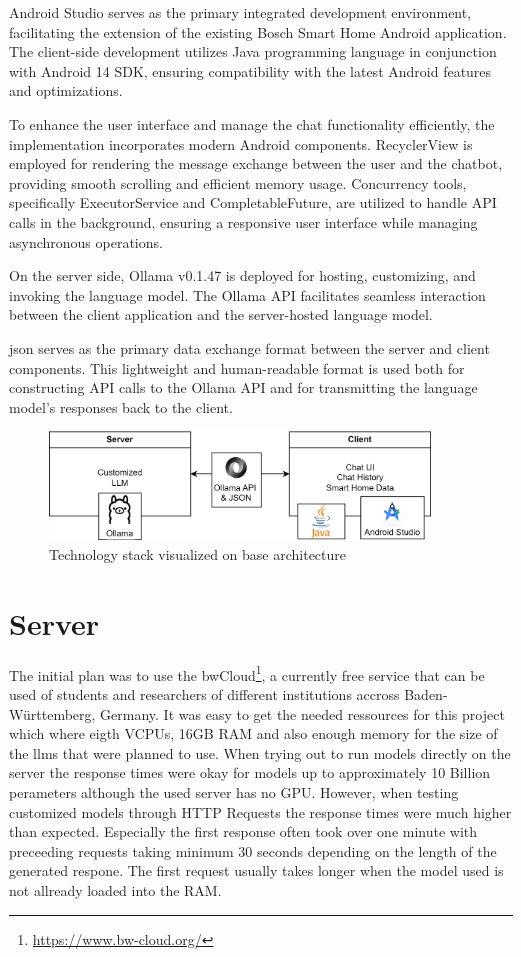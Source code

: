 Android Studio serves as the primary integrated development environment, facilitating the extension of the existing Bosch Smart Home Android application. The client-side development utilizes Java programming language in conjunction with Android 14 SDK, ensuring compatibility with the latest Android features and optimizations.

To enhance the user interface and manage the chat functionality efficiently, the implementation incorporates modern Android components. RecyclerView is employed for rendering the message exchange between the user and the chatbot, providing smooth scrolling and efficient memory usage. Concurrency tools, specifically ExecutorService and CompletableFuture, are utilized to handle API calls in the background, ensuring a responsive user interface while managing asynchronous operations.

On the server side, Ollama v0.1.47 is deployed for hosting, customizing, and invoking the language model. The Ollama API facilitates seamless interaction between the client application and the server-hosted language model.

\gls{json} serves as the primary data exchange format between the server and client components. This lightweight and human-readable format is used both for constructing API calls to the Ollama API and for transmitting the language model's responses back to the client.
\begin{figure}[h]
    \centering
    \captionsetup{justification=centering}
    \includegraphics[width=0.9\textwidth]{graphics/techstack.png}
    \caption{Technology stack visualized on base architecture}
    \label{fig:techstack}
\end{figure}

\section{Server}
The initial plan was to use the bwCloud\footnote{\url{https://www.bw-cloud.org/}}, a currently free service that can be used of students and researchers of different institutions accross Baden-Württemberg, Germany.
It was easy to get the needed ressources for this project which where eigth VCPUs, 16GB RAM and also enough memory for the size of the \glspl{llm} that were planned to use.
When trying out to run models directly on the server the response times were okay for models up to approximately 10 Billion perameters although the used server has no GPU.
However, when testing customized models through HTTP Requests the response times were much higher than expected.
Especially the first response often took over one minute with preceeding requests taking minimum 30 seconds depending on the length of the generated respone.
The first request usually takes longer when the model used is not allready loaded into the RAM.

